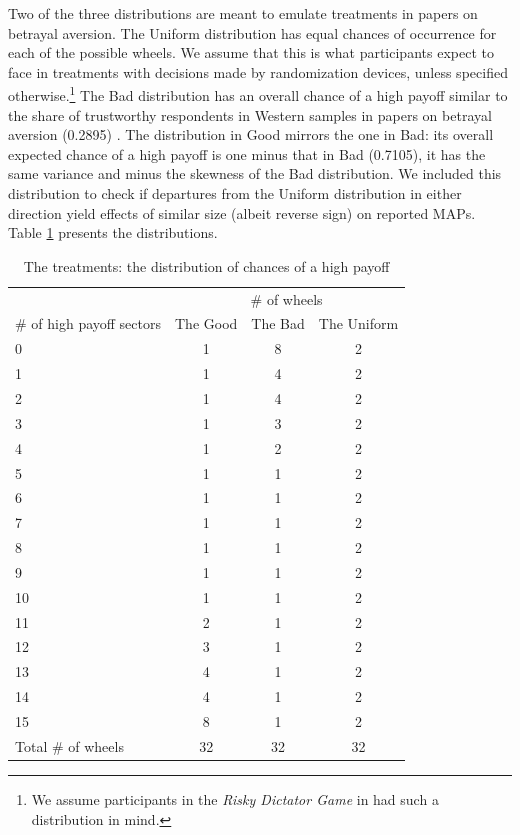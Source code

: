 Two of the three distributions are meant to emulate treatments in papers on betrayal aversion.
The Uniform distribution has equal chances of occurrence for each of the possible wheels.
We assume that this is what participants expect to face in treatments with decisions made by randomization devices, unless specified otherwise.\footnote{
We assume participants in the \textit{Risky Dictator Game} in \cite{Bohnet2004} had such a distribution in mind.
}
The Bad distribution has an overall chance of a high payoff similar to the share of trustworthy respondents in Western samples in papers on betrayal aversion (0.2895) \citep[e.g. ][]{Bohnet2004,Bohnet2008}.
The distribution in Good mirrors the one in Bad: its overall expected chance of a high payoff is one minus that in Bad (0.7105), it has the same variance and minus the skewness of the Bad distribution.
We included this distribution to check if departures from the Uniform distribution in either direction yield effects of similar size (albeit reverse sign) on reported MAPs.
Table \ref{tab:distr} presents the distributions.


\begin{table}[htbp]
\centering \caption{The treatments: the distribution of chances of a high payoff}\label{tab:distr}
\begin{threeparttable}
\begin{tabular}
   {@{}
	l
	*3c
	@{}
	}
\toprule
	&	\multicolumn{3}{c}{\# of wheels}\\
	\cmidrule{2-4}
\# of high payoff sectors 	&	{The Good}&{The Bad}&	{The Uniform}\\
\cmidrule{2-4}
0	&	1&       8&	2\\
1	&	1&       4&	2\\
2	&	1&       4&	2\\
3	&	1&       3&	2\\
4	&	1&       2&	2\\
5	&	1&       1&	2\\
6	&	1&       1&	2\\
7	&	1&       1&	2\\
8	&	1&       1&	2\\
9	&	1&       1&	2\\
10	&	1&       1&	2\\
11	&	2&       1&	2\\
12	&	3&       1&	2\\
13	&	4&       1&	2\\
14	&	4&       1&	2\\
15	&	8&       1&	2\\
\midrule
Total \# of wheels	&	32&       32&	32\\
\bottomrule

\end{tabular}
\end{threeparttable}
\end{table}

